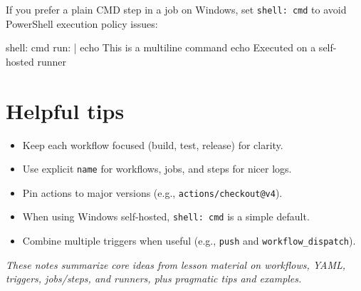 \documentclass[11pt]{article}
\begin{document}
If you prefer a plain CMD step in a job on Windows, set \verb|shell: cmd| to avoid PowerShell execution policy issues:
\begin{textcode}
shell: cmd
run: |
  echo This is a multiline command
  echo Executed on a self-hosted runner
\end{textcode}

\section{Helpful tips}
\begin{itemize}
  \item Keep each workflow focused (build, test, release) for clarity.
  \item Use explicit \verb|name| for workflows, jobs, and steps for nicer logs.
  \item Pin actions to major versions (e.g., \verb|actions/checkout@v4|).
  \item When using Windows self-hosted, \verb|shell: cmd| is a simple default.
  \item Combine multiple triggers when useful (e.g., \verb|push| and \verb|workflow_dispatch|).
\end{itemize}

\bigskip
\noindent\textit{These notes summarize core ideas from lesson material on workflows, YAML, triggers, jobs/steps, and runners, plus pragmatic tips and examples.}
\end{document}
